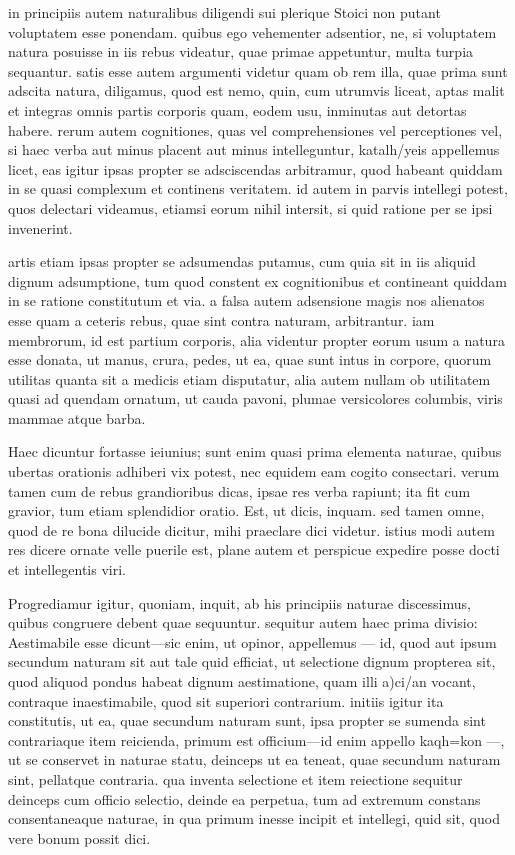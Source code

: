  in principiis autem naturalibus diligendi sui plerique Stoici non putant voluptatem esse ponendam. quibus ego vehementer adsentior, ne, si voluptatem natura posuisse in iis rebus videatur, quae primae appetuntur, multa turpia sequantur. satis esse autem argumenti videtur quam ob rem illa, quae prima sunt adscita natura, diligamus, quod est nemo, quin, cum utrumvis liceat, aptas malit et integras omnis partis corporis quam, eodem usu, inminutas aut detortas habere. rerum autem cognitiones, quas vel comprehensiones vel perceptiones vel, si haec verba aut minus placent aut minus intelleguntur, katalh/yeis appellemus licet, eas igitur ipsas propter se adsciscendas arbitramur, quod habeant quiddam in se quasi complexum et continens veritatem. id autem in parvis intellegi potest, quos delectari videamus, etiamsi eorum nihil intersit, si quid ratione per se ipsi invenerint.

 artis etiam ipsas propter se adsumendas putamus, cum quia sit in iis aliquid dignum adsumptione, tum quod constent ex cognitionibus et contineant quiddam in se ratione constitutum et via. a falsa autem adsensione magis nos alienatos esse quam a ceteris rebus, quae sint contra naturam, arbitrantur. iam membrorum, id est partium corporis, alia videntur propter eorum usum a natura esse donata, ut manus, crura, pedes, ut ea, quae sunt intus in corpore, quorum utilitas quanta sit a medicis etiam disputatur, alia autem nullam ob utilitatem quasi ad quendam ornatum, ut cauda pavoni, plumae versicolores columbis, viris mammae atque barba.

 Haec dicuntur fortasse ieiunius; sunt enim quasi prima elementa naturae, quibus ubertas orationis adhiberi vix potest, nec equidem eam cogito consectari. verum tamen cum de rebus grandioribus dicas, ipsae res verba rapiunt; ita fit cum gravior, tum etiam splendidior oratio. Est, ut dicis, inquam. sed tamen omne, quod de re bona dilucide dicitur, mihi praeclare dici videtur. istius modi autem res dicere ornate velle puerile est, plane autem et perspicue expedire posse docti et intellegentis viri.

 Progrediamur igitur, quoniam, inquit, ab his principiis naturae discessimus, quibus congruere debent quae sequuntur. sequitur autem haec prima divisio: Aestimabile esse dicunt—sic enim, ut opinor, appellemus — id, quod aut ipsum secundum naturam sit aut tale quid efficiat, ut selectione dignum propterea sit, quod aliquod pondus habeat dignum aestimatione, quam illi a)ci/an vocant, contraque inaestimabile, quod sit superiori contrarium. initiis igitur ita constitutis, ut ea, quae secundum naturam sunt, ipsa propter se sumenda sint contrariaque item reicienda, primum est officium—id enim appello kaqh=kon —, ut se conservet in naturae statu, deinceps ut ea teneat, quae secundum naturam sint, pellatque contraria. qua inventa selectione et item reiectione sequitur deinceps cum officio selectio, deinde ea perpetua, tum ad extremum constans consentaneaque naturae, in qua primum inesse incipit et intellegi, quid sit, quod vere bonum possit dici.

